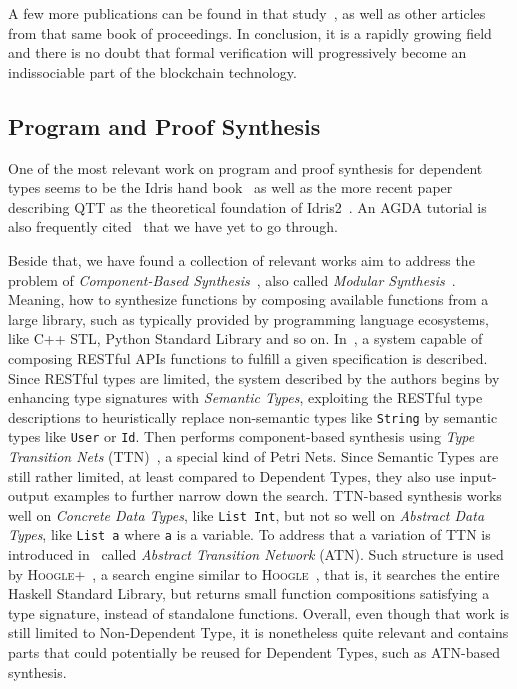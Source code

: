 \documentclass[]{report}
\begin{document}
A few more publications can be found in that study~\cite{Pace2020}, as
well as other articles from that same book of proceedings.  In
conclusion, it is a rapidly growing field and there is no doubt that
formal verification will progressively become an indissociable part of
the blockchain technology.

\subsection{Program and Proof Synthesis}

One of the most relevant work on program and proof synthesis for
dependent types seems to be the Idris hand book~\cite{Brady2017} as
well as the more recent paper describing QTT as the theoretical
foundation of Idris2~\cite{Brady2021}.  An AGDA tutorial is also
frequently cited~\cite{Norell2009} that we have yet to go through.

Beside that, we have found a collection of relevant works aim to
address the problem of \emph{Component-Based
  Synthesis}~\cite{Feng2017}, also called \emph{Modular
  Synthesis}~\cite{Heineman2016}.  Meaning, how to synthesize
functions by composing available functions from a large library, such
as typically provided by programming language ecosystems, like C++
STL, Python Standard Library and so on.  In~\cite{Guo2022}, a system
capable of composing RESTful APIs functions to fulfill a given
specification is described.  Since RESTful types are limited, the
system described by the authors begins by enhancing type signatures
with \emph{Semantic Types}, exploiting the RESTful type descriptions
to heuristically replace non-semantic types like \texttt{String} by
semantic types like \texttt{User} or \texttt{Id}.  Then performs
component-based synthesis using \emph{Type Transition Nets}
(TTN)~\cite{Feng2017}, a special kind of Petri Nets.  Since Semantic
Types are still rather limited, at least compared to Dependent Types,
they also use input-output examples to further narrow down the search.
TTN-based synthesis works well on \emph{Concrete Data Types}, like
\texttt{List Int}, but not so well on \emph{Abstract Data Types}, like
\texttt{List a} where \texttt{a} is a variable.  To address that a
variation of TTN is introduced in~\cite{Guo2020} called \emph{Abstract
  Transition Network} (ATN).  Such structure is used by
\textsc{Hoogle+}~\cite{Michael2020}, a search engine similar to
\textsc{Hoogle}~\cite{Mitchell2004}, that is, it searches the entire
Haskell Standard Library, but returns small function compositions
satisfying a type signature, instead of standalone functions.
Overall, even though that work is still limited to Non-Dependent Type,
it is nonetheless quite relevant and contains parts that could
potentially be reused for Dependent Types, such as ATN-based
synthesis.
\end{document}
